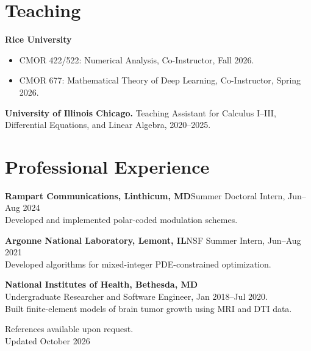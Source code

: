 \documentclass[10pt]{article}
\newcommand{\entry}[2]{\textbf{#1}\hfill #2\\}
\begin{document}
\section*{Teaching}
\textbf{Rice University}
\begin{itemize}
  \item CMOR 422/522: Numerical Analysis, Co-Instructor, Fall 2026.
  \item CMOR 677: Mathematical Theory of Deep Learning, Co-Instructor, Spring 2026.
\end{itemize}
\textbf{University of Illinois Chicago.} Teaching Assistant for Calculus I--III, Differential Equations, and Linear Algebra, 2020--2025.

\section*{Professional Experience}
\entry{Rampart Communications, Linthicum, MD}{Summer Doctoral Intern, Jun--Aug 2024}
Developed and implemented polar-coded modulation schemes.

\entry{Argonne National Laboratory, Lemont, IL}{NSF Summer Intern, Jun--Aug 2021}
Developed algorithms for mixed-integer PDE-constrained optimization.

\textbf{National Institutes of Health, Bethesda, MD}\\
Undergraduate Researcher and Software Engineer, Jan 2018--Jul 2020.\\
Built finite-element models of brain tumor growth using MRI and DTI data.

\vfill
\begin{center}
  References available upon request.\\
  \small Updated October 2026
\end{center}
\end{document}
